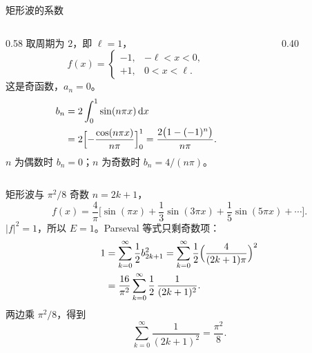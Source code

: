 \documentclass[fontset=windows, chinese, 10pt, xcolor=dvipsnames]{beamer}
\begin{document}
\begin{frame}{矩形波的系数}
  \begin{columns}[c]
    \begin{column}{0.58\textwidth}
      取周期为 $2$，即 $\ell=1$，
      \begin{equation*}
        f(x)=\begin{cases}
          -1, & -\ell<x<0,\\
          +1, & 0<x<\ell.
        \end{cases}
      \end{equation*}
      这是奇函数，$a_n=0$。
      \begin{align*}
        b_n
        &=2\int_0^1\sin(n\pi x)\,\mathrm{d}x \\
        &=2\Bigl[-\frac{\cos(n\pi x)}{n\pi}\Bigr]_0^1
         =\frac{2\bigl(1-(-1)^n\bigr)}{n\pi}.
      \end{align*}
      $n$ 为偶数时 $b_n=0$；$n$ 为奇数时 $b_n=4/(n\pi)$。
    \end{column}
    \begin{column}{0.40\textwidth}
      \centering
    \end{column}
  \end{columns}
\end{frame}

\begin{frame}{矩形波与 $\pi^2/8$}
  奇数 $n=2k+1$，
  \begin{equation*}
    f(x)=\frac{4}{\pi}\Biggl[
      \sin(\pi x)+\frac13\sin(3\pi x)
      +\frac15\sin(5\pi x)+\cdots
    \Biggr].
  \end{equation*}
  $|f|^2=1$，所以 $E=1$。Parseval 等式只剩奇数项：
  \begin{align*}
    1
    &=\sum_{k=0}^{\infty}\frac12 b_{2k+1}^2
     =\sum_{k=0}^{\infty}\frac12\Bigl(\frac{4}{(2k+1)\pi}\Bigr)^2 \\
    &=\frac{16}{\pi^2}\sum_{k=0}^{\infty}
        \frac{1}{2}\,\frac{1}{(2k+1)^2}.
  \end{align*}
  两边乘 $\pi^2/8$，得到
  \begin{equation*}
    \sum_{k=0}^{\infty}\frac{1}{(2k+1)^2}=\frac{\pi^2}{8}.
  \end{equation*}
\end{frame}
\end{document}
